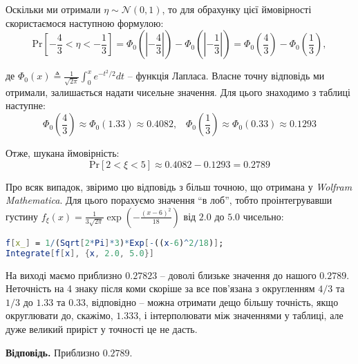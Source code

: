 \documentclass[oneside,solution]{karazin-prob-theory-assign}
\begin{document}
Оскільки ми отримали $\eta \sim \mathcal{N}(0,1)$, то для обрахунку цієї ймовірності скористаємося наступною формулою:
\begin{equation}
    \text{Pr}\left[-\frac{4}{3} < \eta < -\frac{1}{3}\right] = \Phi_0\left(\left|-\frac{4}{3}\right|\right) - \Phi_0\left(\left|-\frac{1}{3}\right|\right) = \Phi_0\left(\frac{4}{3}\right) - \Phi_0\left(\frac{1}{3}\right),
\end{equation}

де $\Phi_0(x) \triangleq \frac{1}{\sqrt{2\pi}}\int_0^x e^{-t^2/2}dt$ -- функція Лапласа. Власне точну відповідь ми отримали, залишається надати чисельне значення. Для цього знаходимо з таблиці наступне:
\begin{equation}
    \Phi_0\left(\frac{4}{3}\right) \approx \Phi_0(1.33) \approx 0.4082, \;\;\; \Phi_0\left(\frac{1}{3}\right) \approx \Phi_0(0.33) \approx 0.1293
\end{equation}

Отже, шукана ймовірність:
\begin{equation}
    \text{Pr}[2 < \xi < 5] \approx 0.4082 - 0.1293 = \boxed{0.2789}
\end{equation}

Про всяк випадок, звіримо цю відповідь з більш точною, що отримана у \textit{Wolfram Mathematica}. Для цього порахуємо значення ``в лоб'', тобто проінтегрувавши густину $f_{\xi}(x) = \frac{1}{3\sqrt{2\pi}}\exp\left(-\frac{(x-6)^2}{18}\right)$ від $2.0$ до $5.0$ чисельно:

\begin{lstlisting}[language=Mathematica]
f[x_] = 1/(Sqrt[2*Pi]*3)*Exp[-((x-6)^2/18)];
Integrate[f[x], {x, 2.0, 5.0}]
\end{lstlisting}

На виході маємо приблизно $0.27823$ -- доволі близьке значення до нашого $0.2789$. Неточність на 4 знаку після коми скоріше за все пов'язана з округленням $4/3$ та $1/3$ до $1.33$ та $0.33$, відповідно -- можна отримати дещо більшу точність, якщо округлювати до, скажімо, $1.333$, і інтерполювати між значеннями у таблиці, але дуже великий приріст у точності це не дасть.

\textbf{Відповідь.} Приблизно $0.2789$.
\end{document}
